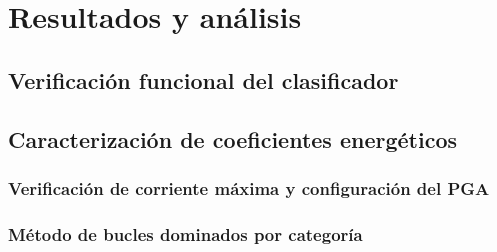 \chapter{Resultados y análisis}
\label{ch:resultados}


\section{Verificación funcional del clasificador}
\label{sec:res_verificacion}


\section{Caracterización de coeficientes energéticos}
\label{sec:res_caracterizacion}

\subsection{Verificación de corriente máxima y configuración del PGA}

\subsection{Método de bucles dominados por categoría}

